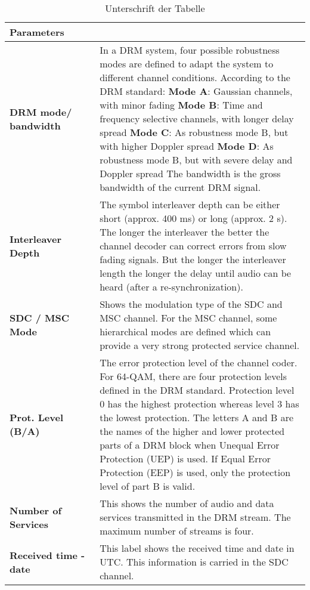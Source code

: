 \begin{table}[h]
	\begin{center}
		\begin{tabular}{p{0.3\linewidth} | p{0.7\linewidth}}	
			
			\textbf{Parameters} &  \\
			\hline
			\textbf{DRM mode/ bandwidth} & In a DRM system, four possible robustness modes are defined to adapt the system to different channel conditions. According to the DRM standard:\newline
			\textbf{Mode A}: Gaussian channels, with minor fading\newline
			\textbf{Mode B}: Time and frequency selective channels, with longer delay spread\newline
			\textbf{Mode C}: As robustness mode B, but with higher Doppler spread\newline
			\textbf{Mode D}: As robustness mode B, but with severe delay and Doppler spread\newline
			The bandwidth is the gross bandwidth of the current DRM signal. \\
			\textbf{Interleaver Depth} & The symbol interleaver depth can be either short (approx. 400 ms) or long (approx. 2 s). The longer the interleaver the better the channel decoder can correct errors from slow fading signals. But the longer the interleaver length the longer the delay until audio can be heard (after a re-synchronization).
			\\
			\textbf{SDC / MSC Mode} & Shows the modulation type of the SDC and MSC channel. For the MSC channel, some hierarchical modes are defined which can provide a very strong protected service channel.
			\\
			\textbf{Prot. Level (B/A)} & The error protection level of the channel coder. For 64-QAM, there are four protection levels defined in the DRM standard. Protection level 0 has the highest protection whereas level 3 has the lowest protection. The letters A and B are the names of the higher and lower protected parts of a DRM block when Unequal Error Protection (UEP) is used. If Equal Error Protection (EEP) is used, only the protection level of part B is valid.
			\\
			\textbf{Number of Services} & This shows the number of audio and data services transmitted in the DRM stream. The maximum number of streams is four.
			\\
			\textbf{Received time - date} & This label shows the received time and date in UTC. This information is carried in the SDC channel.
			\\
			\hline
		\end{tabular}
		\caption{Unterschrift  der Tabelle}
		\label{tab:Tabelle1}
	\end{center}
\end{table}
